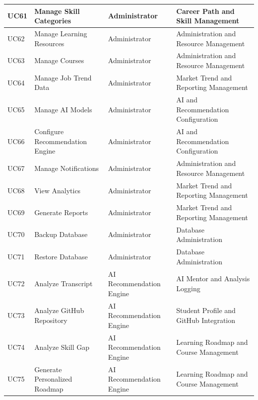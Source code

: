 \begin{longtable}{|>{\centering\arraybackslash}m{0.8cm}|>{\raggedright\arraybackslash}m{3.0cm}|>{\raggedright\arraybackslash}m{2.4cm}|>{\raggedright\arraybackslash}m{4.8cm}|}
UC61 & Manage Skill Categories & Administrator & Career Path and Skill Management \\
\hline

UC62 & Manage Learning Resources & Administrator & Administration and Resource Management \\
\hline

UC63 & Manage Courses & Administrator & Administration and Resource Management \\
\hline

UC64 & Manage Job Trend Data & Administrator & Market Trend and Reporting Management \\
\hline

UC65 & Manage AI Models & Administrator & AI and Recommendation Configuration \\
\hline

UC66 & Configure Recommendation Engine & Administrator & AI and Recommendation Configuration \\
\hline

UC67 & Manage Notifications & Administrator & Administration and Resource Management \\
\hline

UC68 & View Analytics & Administrator & Market Trend and Reporting Management \\
\hline

UC69 & Generate Reports & Administrator & Market Trend and Reporting Management \\
\hline

UC70 & Backup Database & Administrator & Database Administration \\
\hline

UC71 & Restore Database & Administrator & Database Administration \\
\hline

UC72 & Analyze Transcript & AI Recommendation Engine & AI Mentor and Analysis Logging \\
\hline

UC73 & Analyze GitHub Repository & AI Recommendation Engine & Student Profile and GitHub Integration \\
\hline

UC74 & Analyze Skill Gap & AI Recommendation Engine & Learning Roadmap and Course Management \\
\hline

UC75 & Generate Personalized Roadmap & AI Recommendation Engine & Learning Roadmap and Course Management \\
\hline


\end{longtable}

